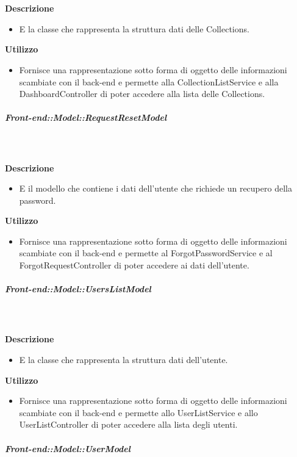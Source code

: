         \textbf{\\ \\ Descrizione} 
          \begin{itemize}
            \item[] E la classe che rappresenta la struttura dati delle Collections.
          \end{itemize}      
        \textbf{Utilizzo}  
          \begin{itemize}
            \item[] Fornisce una rappresentazione sotto forma di oggetto delle informazioni scambiate con il back-end e permette alla CollectionListService e alla DashboardController di poter accedere alla lista delle Collections.
          \end{itemize}
      \subparagraph{Front-end::Model::RequestResetModel}
        
        \textbf{\\ \\ Descrizione} 
          \begin{itemize}
            \item[] E il modello che contiene i dati dell'utente che richiede un recupero della password.
          \end{itemize}      
        \textbf{Utilizzo}  
          \begin{itemize}
            \item[] Fornisce una rappresentazione sotto forma di oggetto delle informazioni scambiate con il back-end e permette al ForgotPasswordService e al ForgotRequestController di poter accedere ai dati dell'utente.
          \end{itemize}
      \subparagraph{Front-end::Model::UsersListModel}
        
        \textbf{\\ \\ Descrizione} 
          \begin{itemize}
            \item[] E la classe che rappresenta la struttura dati dell'utente.
          \end{itemize}      
        \textbf{Utilizzo}  
          \begin{itemize}
            \item[] Fornisce una rappresentazione sotto forma di oggetto delle informazioni scambiate con il back-end e permette allo UserListService e allo UserListController di poter accedere alla lista degli utenti.
          \end{itemize}
      \subparagraph{Front-end::Model::UserModel}
        
